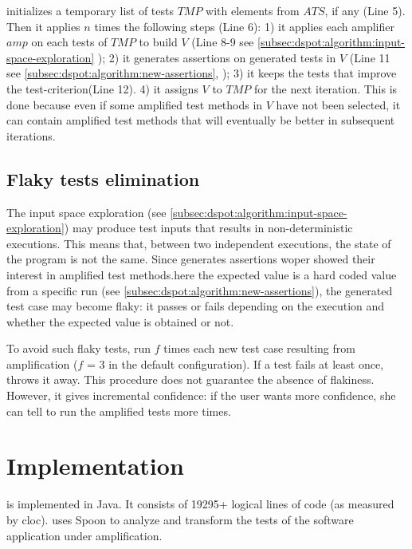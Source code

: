 \dspot initializes a temporary list of tests $TMP$ with elements from $ATS$, if any (Line 5).
Then it applies $n$ times the following steps (Line 6):
1) it applies each amplifier $amp$ on each tests of $TMP$ to build $V$ (Line 8-9 see \autoref{subsec:dspot:algorithm:input-space-exploration} \ie \Iampl);
2) it generates assertions on generated tests in $V$ (Line 11 see \autoref{subsec:dspot:algorithm:new-assertions}, \ie \Aampl);
3) it keeps the tests that improve the test-criterion(Line 12).
4) it assigns $V$ to $TMP$ for the next iteration. This is done because even if some amplified test methods in $V$ have not been selected, it can contain amplified test methods that will eventually be better in subsequent iterations.

\subsection{Flaky tests elimination}
\label{subsec:dspot:algorithm:flaky-test-elimination}
The input space exploration (see \autoref{subsec:dspot:algorithm:input-space-exploration}) may produce test inputs that results in non-deterministic executions.
This means that, between two independent executions, the state of the program is not the same.
Since \dspot generates assertions woper showed their interest in amplified test methods.here the expected value is a hard coded value from a specific run (see \autoref{subsec:dspot:algorithm:new-assertions}), the generated test case may become flaky: it passes or fails depending on the execution and whether the expected value is obtained or not.

To avoid such flaky tests, \dspot run $f$ times each new test case resulting from amplification ($f$ = 3 in the default configuration). 
If a test fails at least once, \dspot throws it away. 
This procedure does not guarantee the absence of flakiness.
However, it gives incremental confidence: if the user wants more confidence, she can tell \dspot to run the amplified tests more times.

\section{Implementation}
\label{sec:dspot:implemention}

\dspot is implemented in Java.
It consists of 19295+ logical lines of code (as measured by cloc).
\dspot uses Spoon\cite{pawlak:hal-01169705} to analyze and transform the tests of the software application under amplification.

